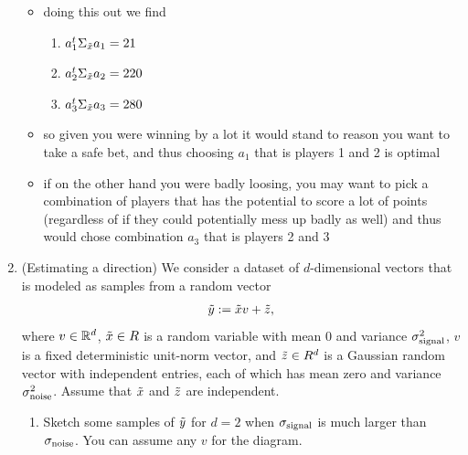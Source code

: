 \documentclass[12pt,twoside]{article}
\begin{document}
\begin{enumerate}
\begin{itemize}
\item doing this out we find 
\begin{enumerate}
  \item $a_{1}^t\Sigma_{\Tilde{x}}a_{1}=21$
  \item $a_{2}^t\Sigma_{\Tilde{x}}a_{2}=220$
  \item $a_{3}^t\Sigma_{\Tilde{x}}a_{3}=280$
\end{enumerate}
\item so given you were winning by a lot it would stand to reason you want to take a safe bet, and thus choosing $a_1$ that is players 1 and 2 is optimal
\item if on the other hand you were badly loosing, you may want to pick a combination of players that has the potential to score a lot of points (regardless of if they could potentially mess up badly as well) and thus would chose combination $a_3$ that is players 2 and 3  
\end{itemize}
\newpage


\item (Estimating a direction) We consider a dataset of $d$-dimensional vectors that is modeled as samples from a random vector
\begin{align}
\tilde{  y } := \tilde{ x }v + \tilde{  z },
\end{align}
where $v \in \mathbb{R}^d$, $\tilde{ x } \in R$ is a random variable with mean 0 and variance $\sigma_{\operatorname{signal}}^2$, $v$ is a fixed deterministic unit-norm vector, and $\tilde{  z } \in R^d$ is a Gaussian random vector with independent entries, each of which has mean zero and variance $\sigma_{\operatorname{noise}}^2$. Assume that $\tilde{ x }$ and $\tilde{  z }$ are independent.
\begin{enumerate}
\item Sketch some samples of $\tilde{  y }$ for $d=2$ when $\sigma_{\operatorname{signal}}$ is much larger than $\sigma_{\operatorname{noise}}$. You can assume any $v$ for the diagram.  




\end{enumerate}
\end{enumerate}
\end{document}
